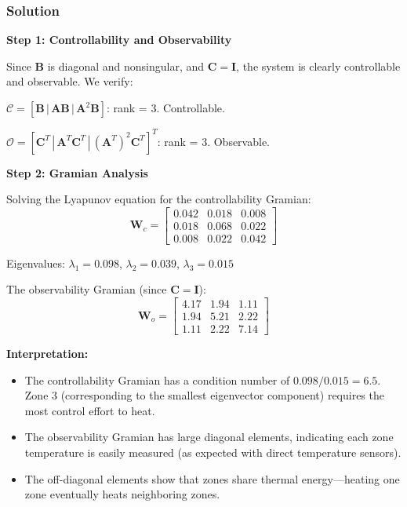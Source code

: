 \subsubsection{Solution}

\textbf{Step 1: Controllability and Observability}

Since $\mathbf{B}$ is diagonal and nonsingular, and $\mathbf{C} = \mathbf{I}$, the system is clearly controllable and observable. We verify:

$\mathcal{C} = [\mathbf{B} \,|\, \mathbf{A}\mathbf{B} \,|\, \mathbf{A}^2\mathbf{B}]$: rank = 3. Controllable.

$\mathcal{O} = [\mathbf{C}^T \,|\, \mathbf{A}^T\mathbf{C}^T \,|\, (\mathbf{A}^T)^2\mathbf{C}^T]^T$: rank = 3. Observable.

\textbf{Step 2: Gramian Analysis}

Solving the Lyapunov equation for the controllability Gramian:
\begin{equation}
\mathbf{W}_c = \begin{bmatrix} 0.042 & 0.018 & 0.008 \\ 0.018 & 0.068 & 0.022 \\ 0.008 & 0.022 & 0.042 \end{bmatrix}
\end{equation}

Eigenvalues: $\lambda_1 = 0.098$, $\lambda_2 = 0.039$, $\lambda_3 = 0.015$

The observability Gramian (since $\mathbf{C} = \mathbf{I}$):
\begin{equation}
\mathbf{W}_o = \begin{bmatrix} 4.17 & 1.94 & 1.11 \\ 1.94 & 5.21 & 2.22 \\ 1.11 & 2.22 & 7.14 \end{bmatrix}
\end{equation}

\textbf{Interpretation:}
\begin{itemize}
\item The controllability Gramian has a condition number of $0.098/0.015 = 6.5$. Zone 3 (corresponding to the smallest eigenvector component) requires the most control effort to heat.
\item The observability Gramian has large diagonal elements, indicating each zone temperature is easily measured (as expected with direct temperature sensors).
\item The off-diagonal elements show that zones share thermal energy---heating one zone eventually heats neighboring zones.
\end{itemize}


